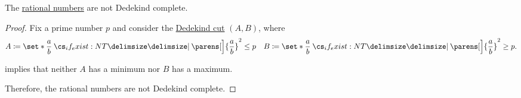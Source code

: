 \begin{corollary}\label{thm:rational_numbers_not_dedekind_complete}
  The \hyperref[def:rational_numbers]{rational numbers} are not Dedekind complete.
\end{corollary}
\begin{proof}
  Fix a prime number \( p \) and consider the \hyperref[def:dedekind_cut]{Dedekind cut} \( (A, B) \), where
  \begin{align*}
    A \coloneqq \set*{ \frac a b \given* \parens[\Big]{ \frac a b }^2 \leq p }
    &&
    B \coloneqq \set*{ \frac a b \given* \parens[\Big]{ \frac a b }^2 \geq p }.
  \end{align*}

   implies that neither \( A \) has a minimum nor \( B \) has a maximum.

  Therefore, the rational numbers are not Dedekind complete.
\end{proof}
